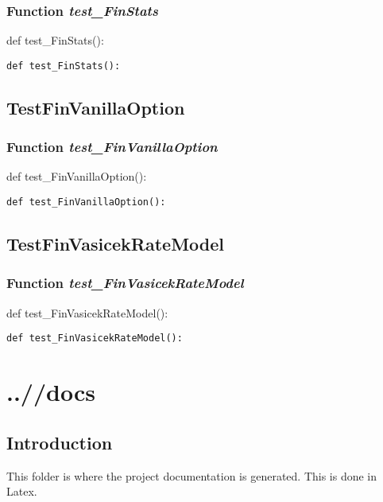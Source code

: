 \documentclass[twoside,11pt]{book}
\begin{document}
\subsection{Function {\it test\_FinStats}}
def test\_FinStats():

\begin{lstlisting}
def test_FinStats():
\end{lstlisting}


\newpage
\section{TestFinVanillaOption}

\subsection{Function {\it test\_FinVanillaOption}}
def test\_FinVanillaOption():

\begin{lstlisting}
def test_FinVanillaOption():
\end{lstlisting}


\newpage
\section{TestFinVasicekRateModel}

\subsection{Function {\it test\_FinVasicekRateModel}}
def test\_FinVasicekRateModel():

\begin{lstlisting}
def test_FinVasicekRateModel():
\end{lstlisting}


\chapter{..//docs}
\section{Introduction}
This folder is where the project documentation is generated. This is done in Latex.
\end{document}
